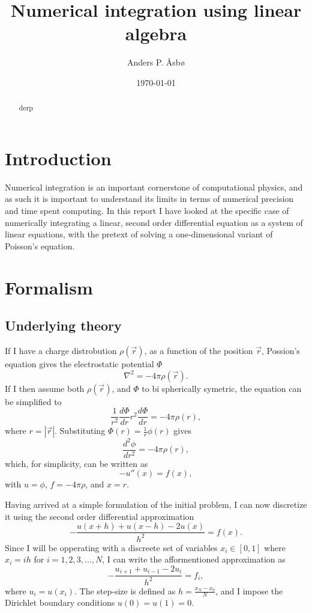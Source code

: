 \documentclass[english,notitlepage,reprint]{revtex4-1}  %
\begin{document}
\title{Numerical integration using linear algebra}   %
\author{Anders P. Åsbø}               %
\date{\today}
\noaffiliation                            %

\begin{abstract}
derp
\end{abstract}

\maketitle
\tableofcontents

\section{Introduction}\label{sec:1}
Numerical integration is an important cornerstone of computational physics, and as such it is important to understand its limits in terms of numerical precision and time spent computing. In this report I have looked at the specific case of numerically integrating a linear, second order differential equation as a system of linear equations, with the pretext of solving a one-dimensional variant of Poisson's equation.

\section{Formalism}\label{sec:2}
\subsection{Underlying theory}\label{subsec:21}
If I have a charge distrobution \(\rho(\vec{r})\), as a function of the position \(\vec{r}\), Possion's equation gives the electrostatic potential \(\Phi\)
$$
	\nabla^{2}=-4\pi\rho(\vec{r}).
$$
If I then assume both \(\rho(\vec{r})\), and \(\Phi\) to bi spherically symetric, the equation can be simplified to
$$
	\frac{1}{r^{2}}\frac{d\Phi}{dr}r^{2}\frac{d\Phi}{dr}=-4\pi\rho(r),
$$
where \(r=|\vec{r}|\). Substituting \(\Phi(r)=\frac{1}{r}\phi(r)\) gives
$$
	\frac{d^{2}\phi}{dr^{2}}=-4\pi\rho(r),
$$
which, for simplicity, can be written as
$$
	-u''(x)=f(x),
$$
with \(u = \phi\), \(f=-4\pi\rho\), and \(x = r\).

Having arrived at a simple formulation of the initial problem, I can now discretize it using the second order differential approximation
$$
	-\frac{u(x+h)+u(x-h)-2u(x)}{h^{2}}=f(x).
$$
Since I will be opperating with a discreete set of variables \(x_{i}\in[0,1]\) where \(x_{i}=ih\) for \(i=1,2,3,...,N\), I can write the afformentioned approximation as
$$
	-\frac{u_{i+1}+u_{i-1}-2u_{i}}{h^{2}}=f_{i},
$$
where \(u_{i}=u(x_{i})\). The step-size is defined as \(h=\frac{x_{N}-x_{0}}{N}\), and I impose the Dirichlet boundary conditions \(u(0)=u(1)=0\).
\end{document}
